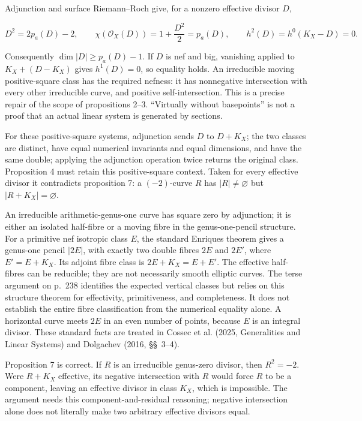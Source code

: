 Adjunction and surface Riemann--Roch give, for a nonzero effective divisor \(D\),

\[
D^2=2p_a(D)-2,\qquad
\chi(\mathcal O_X(D))=1+\frac{D^2}{2}=p_a(D),\qquad
h^2(D)=h^0(K_X-D)=0.
\]

Consequently \(\dim\vert D\vert \ge p_a(D)-1\). If \(D\) is nef and big, vanishing applied to \(K_X+(D-K_X)\) gives \(h^1(D)=0\), so equality holds. An irreducible moving positive-square class has the required nefness: it has nonnegative intersection with every other irreducible curve, and positive self-intersection. This is a precise repair of the scope of propositions 2--3. ``Virtually without basepoints'' is not a proof that an actual linear system is generated by sections.

For these positive-square systems, adjunction sends \(D\) to \(D+K_X\); the two classes are distinct, have equal numerical invariants and equal dimensions, and have the same double; applying the adjunction operation twice returns the original class. Proposition 4 must retain this positive-square context. Taken for every effective divisor it contradicts proposition 7: a \((-2)\)-curve \(R\) has \(\vert R\vert \ne\varnothing\) but \(\vert R+K_X\vert =\varnothing\).

An irreducible arithmetic-genus-one curve has square zero by adjunction; it is either an isolated half-fibre or a moving fibre in the genus-one-pencil structure. For a primitive nef isotropic class \(E\), the standard Enriques theorem gives a genus-one pencil \(\vert 2E\vert \), with exactly two double fibres \(2E\) and \(2E'\), where \(E'=E+K_X\). Its adjoint fibre class is \(2E+K_X=E+E'\). The effective half-fibres can be reducible; they are not necessarily smooth elliptic curves. The terse argument on p.~238 identifies the expected vertical classes but relies on this structure theorem for effectivity, primitiveness, and completeness. It does not establish the entire fibre classification from the numerical equality alone. A horizontal curve meets \(2E\) in an even number of points, because \(E\) is an integral divisor. These standard facts are treated in Cossec et al. (2025, Generalities and Linear Systems) and Dolgachev (2016, \S\S~3--4).

Proposition 7 is correct. If \(R\) is an irreducible genus-zero divisor, then \(R^2=-2\). Were \(R+K_X\) effective, its negative intersection with \(R\) would force \(R\) to be a component, leaving an effective divisor in class \(K_X\), which is impossible. The argument needs this component-and-residual reasoning; negative intersection alone does not literally make two arbitrary effective divisors equal.


